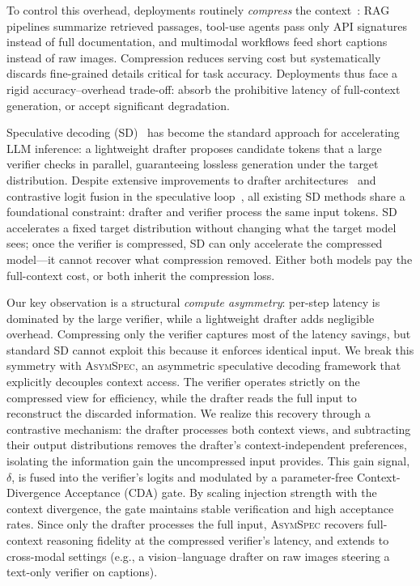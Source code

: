 \documentclass[11pt]{article}
\theoremstyle{plain}
\theoremstyle{definition}
\begin{document}
To control this overhead, deployments routinely \emph{compress} the context~\citep{llmlingua2024}: RAG pipelines summarize retrieved passages, tool-use agents pass only API signatures instead of full documentation, and multimodal workflows feed short captions instead of raw images. Compression reduces serving cost but systematically discards fine-grained details critical for task accuracy. Deployments thus face a rigid accuracy--overhead trade-off: absorb the prohibitive latency of full-context generation, or accept significant degradation.

Speculative decoding (SD)~\citep{leviathan2023fast,chen2023accelerating} has become the standard approach for accelerating LLM inference: a lightweight drafter proposes candidate tokens that a large verifier checks in parallel, guaranteeing lossless generation under the target distribution. Despite extensive improvements to drafter architectures~\citep{li2024eagle,cai2024medusa,li2024eagle2} and contrastive logit fusion in the speculative loop~\citep{yuan2023scd}, all existing SD methods share a foundational constraint: drafter and verifier process the same input tokens. SD accelerates a fixed target distribution without changing what the target model sees; once the verifier is compressed, SD can only accelerate the compressed model---it cannot recover what compression removed. Either both models pay the full-context cost, or both inherit the compression loss.

Our key observation is a structural \emph{compute asymmetry}: per-step latency is dominated by the large verifier, while a lightweight drafter adds negligible overhead. Compressing only the verifier captures most of the latency savings, but standard SD cannot exploit this because it enforces identical input. We break this symmetry with \textsc{AsymSpec}, an asymmetric speculative decoding framework that explicitly decouples context access. The verifier operates strictly on the compressed view for efficiency, while the drafter reads the full input to reconstruct the discarded information. We realize this recovery through a contrastive mechanism: the drafter processes both context views, and subtracting their output distributions removes the drafter's context-independent preferences, isolating the information gain the uncompressed input provides. This gain signal, $\delta$, is fused into the verifier's logits and modulated by a parameter-free Context-Divergence Acceptance (CDA) gate. By scaling injection strength with the context divergence, the gate maintains stable verification and high acceptance rates. Since only the drafter processes the full input, \textsc{AsymSpec} recovers full-context reasoning fidelity at the compressed verifier's latency, and extends to cross-modal settings (e.g., a vision--language drafter on raw images steering a text-only verifier on captions).
\end{document}
